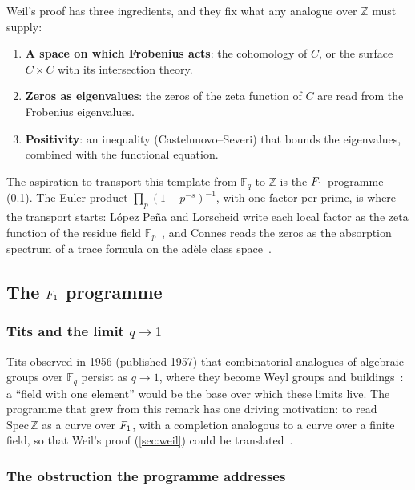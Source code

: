 Weil's proof has three ingredients, and they fix what any analogue over
$\mathbb{Z}$ must supply:
\begin{enumerate}
  \item[(a)] \textbf{A space on which Frobenius acts}: the cohomology of $C$, or
    the surface $C\times C$ with its intersection theory.
  \item[(b)] \textbf{Zeros as eigenvalues}: the zeros of the zeta function of $C$
    are read from the Frobenius eigenvalues.
  \item[(c)] \textbf{Positivity}: an inequality (Castelnuovo--Severi) that bounds
    the eigenvalues, combined with the functional equation.
\end{enumerate}
The aspiration to transport this template from $\mathbb{F}_q$ to $\mathbb{Z}$
is the $F_1$ programme (\cref{sec:f1-programme}).  The Euler product
$\prod_p(1-p^{-s})^{-1}$, with one factor per prime, is where the transport
starts: L\'opez Pe\~na and Lorscheid write each local factor as the zeta
function of the residue field $\mathbb{F}_p$~\cite{lopezpena09torified}, and
Connes reads the zeros as the absorption spectrum of a trace formula on the
ad\`ele class space~\cite{connes99,connes16}.

\subsection{The $F_1$ programme}\label{sec:f1-programme}

\subsubsection{Tits and the limit $q\to1$}

Tits observed in 1956 (published 1957) that combinatorial analogues of algebraic groups over
$\mathbb{F}_q$ persist as $q\to1$, where they become Weyl groups and
buildings~\cite{tits56}: a ``field with one element'' would be the base over
which these limits live.  The programme that grew from this remark has one
driving motivation: to read $\mathrm{Spec}\,\mathbb{Z}$ as a curve over $F_1$,
with a completion analogous to a curve over a finite field, so that Weil's proof
(\cref{sec:weil}) could be translated~\cite{lorscheid12blueprints}.

\subsubsection{The obstruction the programme addresses}\label{ssec:f1-obstruction}

